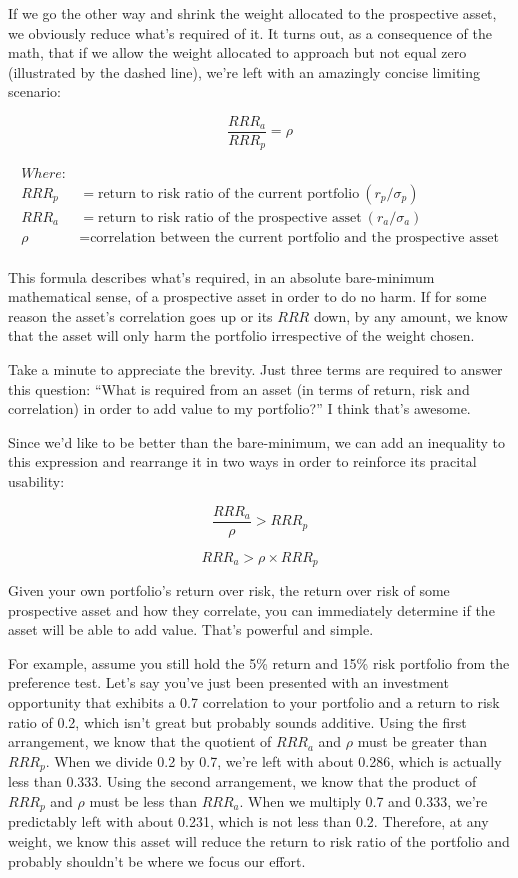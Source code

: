 \documentclass[]{article}
\begin{document}
If we go the other way and shrink the weight allocated to the
prospective asset, we obviously reduce what's required of it. It turns
out, as a consequence of the math, that if we allow the weight allocated
to approach but not equal zero (illustrated by the dashed line), we're
left with an amazingly concise limiting scenario:

\[
\frac{RRR_a}{RRR_p} = \rho
\]

\[
\begin{aligned}
Where: & \\
RRR_p & = \text{return to risk ratio of the current portfolio}\ (r_p / \sigma_p) \\
RRR_a & = \text{return to risk ratio of the prospective asset}\ (r_a / \sigma_a) \\
\rho & = \text{correlation between the current portfolio and the prospective asset} \\
\end{aligned}
\]

This formula describes what's required, in an absolute bare-minimum
mathematical sense, of a prospective asset in order to do no harm. If
for some reason the asset's correlation goes up or its \(RRR\) down, by
any amount, we know that the asset will only harm the portfolio
irrespective of the weight chosen.

Take a minute to appreciate the brevity. Just three terms are required
to answer this question: ``What is required from an asset (in terms of
return, risk and correlation) in order to add value to my portfolio?'' I
think that's awesome.

Since we'd like to be better than the bare-minimum, we can add an
inequality to this expression and rearrange it in two ways in order to
reinforce its pracital usability:

\[
\frac{RRR_a}{\rho} > RRR_p
\]

\[
RRR_a > \rho \times RRR_p
\]

Given your own portfolio's return over risk, the return over risk of
some prospective asset and how they correlate, you can immediately
determine if the asset will be able to add value. That's powerful and
simple.

For example, assume you still hold the 5\% return and 15\% risk
portfolio from the preference test. Let's say you've just been presented
with an investment opportunity that exhibits a 0.7 correlation to your
portfolio and a return to risk ratio of 0.2, which isn't great but
probably sounds additive. Using the first arrangement, we know that the
quotient of \(RRR_a\) and \(\rho\) must be greater than \(RRR_p\). When
we divide 0.2 by 0.7, we're left with about 0.286, which is actually
less than 0.333. Using the second arrangement, we know that the product
of \(RRR_p\) and \(\rho\) must be less than \(RRR_a\). When we multiply
0.7 and 0.333, we're predictably left with about 0.231, which is not
less than 0.2. Therefore, at any weight, we know this asset will reduce
the return to risk ratio of the portfolio and probably shouldn't be
where we focus our effort.
\end{document}

